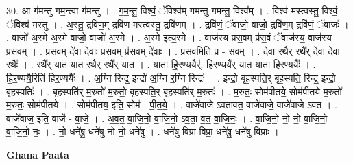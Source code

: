 \documentclass[17pt]{extarticle}
\begin{document}
30. आ ग॑मन्तु गम॒न्त्वा ग॑मन्तु । . ग॒म॒न्तु॒ विश्वं॒ ॅविश्व॑म् गमन्तु गमन्तु॒ विश्व᳚म् । . विश्व॑ मस्त्वस्तु॒ विश्वं॒ ॅविश्व॑ मस्तु । . अ॒स्तु॒ द्रवि॑ण॒म् द्रवि॑ण मस्त्वस्तु॒ द्रवि॑णम् । . द्रवि॑णं॒ ॅवाजो॒ वाजो॒ द्रवि॑ण॒म् द्रवि॑णं॒ ॅवाजः॑ । . वाजो॑ अ॒स्मे अ॒स्मे वाजो॒ वाजो॑ अ॒स्मे । . अ॒स्मे इत्य॒स्मे । . वाज॑स्य प्रस॒वम् प्र॑स॒वं ॅवाज॑स्य॒ वाज॑स्य प्रस॒वम् । . प्र॒स॒वम् दे॑वा देवाः प्रस॒वम् प्र॑स॒वम् दे॑वाः । . प्र॒स॒वमिति॑ प्र - स॒वम् । . दे॒वा॒ रथै॒र् रथै᳚र् देवा देवा॒ रथैः᳚ । . रथै᳚र् यात यात॒ रथै॒र् रथै᳚र् यात । . या॒ता॒ हि॒र॒ण्ययैर्॑. हिर॒ण्ययै᳚र् यात याता हिर॒ण्ययैः᳚ । . हि॒र॒ण्ययै॒रिति॑ हिर॒ण्ययैः᳚ । . अ॒ग्नि रिन्द्र॒ इन्द्रो॑ अ॒ग्नि र॒ग्नि रिन्द्रः॑ । . इन्द्रो॒ बृह॒स्पति॒र् बृह॒स्पति॒ रिन्द्र॒ इन्द्रो॒ बृह॒स्पतिः॑ । . बृह॒स्पति॑र् म॒रुतो॑ म॒रुतो॒ बृह॒स्पति॒र् बृह॒स्पति॑र् म॒रुतः॑ । . म॒रुतः॒ सोम॑पीतये॒ सोम॑पीतये म॒रुतो॑ म॒रुतः॒ सोम॑पीतये । . सोम॑पीतय॒ इति॒ सोम॑ - पी॒त॒ये॒ । . वाजे॑वाजे ऽवतावत॒ वाजे॑वाजे॒ वाजे॑वाजे ऽवत । . वाजे॑वाज॒ इति॒ वाजे᳚ - वा॒जे॒ । . अ॒व॒त॒ वा॒जि॒नो॒ वा॒जि॒नो॒ ऽव॒ता॒ व॒त॒ वा॒जि॒नः॒ । . वा॒जि॒नो॒ नो॒ नो॒ वा॒जि॒नो॒ वा॒जि॒नो॒ नः॒ । . नो॒ धने॑षु॒ धने॑षु नो नो॒ धने॑षु । . धने॑षु विप्रा विप्रा॒ धने॑षु॒ धने॑षु विप्राः । \newline

\textbf{Ghana Paata } \newline
\end{document}
